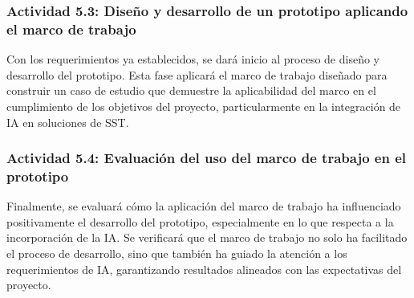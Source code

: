 \subsubsection{Actividad 5.3: Diseño y desarrollo de un prototipo aplicando el marco de trabajo}
Con los requerimientos ya establecidos, se dará inicio al proceso de diseño y desarrollo del prototipo. Esta fase aplicará el marco de trabajo diseñado para construir un caso de estudio que demuestre la aplicabilidad del marco en el cumplimiento de los objetivos del proyecto, particularmente en la integración de IA en soluciones de SST.

\subsubsection{Actividad 5.4: Evaluación del uso del marco de trabajo en el prototipo}
Finalmente, se evaluará cómo la aplicación del marco de trabajo ha influenciado positivamente el desarrollo del prototipo, especialmente en lo que respecta a la incorporación de la IA. Se verificará que el marco de trabajo no solo ha facilitado el proceso de desarrollo, sino que también ha guiado la atención a los requerimientos de IA, garantizando resultados alineados con las expectativas del proyecto.










